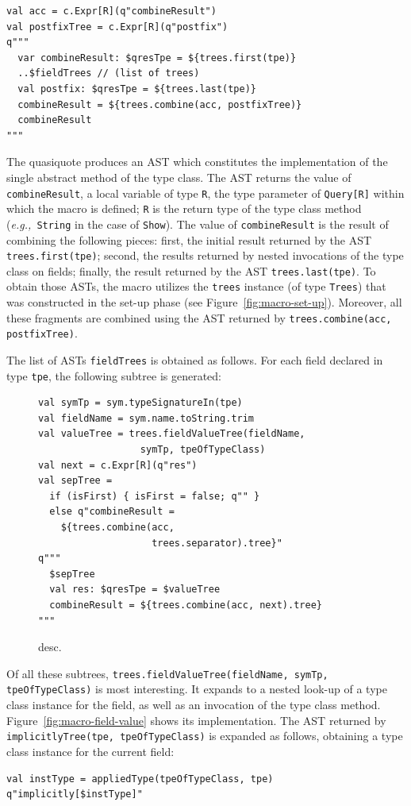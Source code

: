 \documentclass[preprint,nocopyrightspace]{sigplanconf}
\newcommand{\eg}{{\em e.g.,~}}
\begin{document}
\begin{lstlisting}
val acc = c.Expr[R](q"combineResult")
val postfixTree = c.Expr[R](q"postfix")
q"""
  var combineResult: $qresTpe = ${trees.first(tpe)}
  ..$fieldTrees // (list of trees)
  val postfix: $qresTpe = ${trees.last(tpe)}
  combineResult = ${trees.combine(acc, postfixTree)}
  combineResult
"""
\end{lstlisting}
\noindent

The quasiquote produces an AST which constitutes the implementation of the
single abstract method of the type class. The AST returns the value of
\verb|combineResult|, a local variable of type \verb|R|, the type parameter of
\verb|Query[R]| within which the macro is defined; \verb|R| is the return type
of the type class method (\eg \verb|String| in the case of \verb|Show|). The
value of \verb|combineResult| is the result of combining the following pieces:
first, the initial result returned by the AST \verb|trees.first(tpe)|; second,
the results returned by nested invocations of the type class on fields;
finally, the result returned by the AST \verb|trees.last(tpe)|. To obtain
those ASTs, the macro utilizes the \verb|trees| instance (of type
\verb|Trees|) that was constructed in the set-up phase (see
Figure~\ref{fig:macro-set-up}). Moreover, all these fragments are combined using the AST
returned by \verb|trees.combine(acc, postfixTree)|.

The list of ASTs \verb|fieldTrees| is obtained as follows. For each field
declared in type \verb|tpe|, the following subtree is generated:

\begin{figure}
\centering
\begin{lstlisting}
val symTp = sym.typeSignatureIn(tpe)
val fieldName = sym.name.toString.trim
val valueTree = trees.fieldValueTree(fieldName,
                  symTp, tpeOfTypeClass)
val next = c.Expr[R](q"res")
val sepTree =
  if (isFirst) { isFirst = false; q"" }
  else q"combineResult =
    ${trees.combine(acc,
                    trees.separator).tree}"
q"""
  $sepTree
  val res: $qresTpe = $valueTree
  combineResult = ${trees.combine(acc, next).tree}
"""
\end{lstlisting}
  \caption{desc.}
  \label{fig:macro-combine-result}
\end{figure}

Of all these subtrees,
\verb|trees.fieldValueTree(fieldName, symTp, tpeOfTypeClass)| is most interesting.
It expands to a nested look-up of a type class instance for the field, as well as
an invocation of the type class method. Figure~\ref{fig:macro-field-value} shows its implementation.
The AST returned by \verb|implicitlyTree(tpe, tpeOfTypeClass)| is expanded as follows,
obtaining a type class instance for the current field:
\begin{lstlisting}
val instType = appliedType(tpeOfTypeClass, tpe)
q"implicitly[$instType]"
\end{lstlisting}
\end{document}
